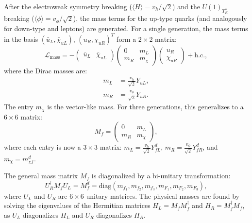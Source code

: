 After the electroweak symmetry breaking ($\langle H \rangle = v_h / \sqrt{2}$) and the $U(1)_{T_R^3}$ breaking ($\langle \phi \rangle = v_\phi / \sqrt{2}$), the mass terms for the up-type quarks (and analogously for down-type and leptons) are generated. For a single generation, the mass terms in the basis $(\bar{u}_L, \bar{\chi}_{u L})$, $(u_R, \chi_{u R})^T$ form a $2 \times 2$ matrix:
\begin{equation}
\mathcal{L}_{\text{mass}} = - \begin{pmatrix} \bar{u}_L & \bar{\chi}_{u L} \end{pmatrix}
\begin{pmatrix}
0 & m_L \\
m_R & m_{\chi}
\end{pmatrix}
\begin{pmatrix} u_R \\ \chi_{u R} \end{pmatrix} + \text{h.c.}, \label{eq:mass_matrix_detail}
\end{equation}
where the Dirac masses are:
\begin{align*}
m_L &= \frac{v_h}{\sqrt{2}} Y_{uL}, \\
m_R &= \frac{v_\phi}{\sqrt{2}} Y_{uR}.
\end{align*}
The entry $m_{\chi}$ is the vector-like mass. For three generations, this generalizes to a $6 \times 6$ matrix:
\begin{equation}
M_f = \begin{pmatrix}
0 & m_L \\
m_R & m_{\chi}
\end{pmatrix},
\end{equation}
where each entry is now a $3 \times 3$ matrix: $m_L = \frac{v_h}{\sqrt{2}} Y_{fL}^{d}$, $m_R = \frac{v_\phi}{\sqrt{2}} Y_{fR}^{d}$, and $m_{\chi} = m_{\chi f}^{d}$.

The general mass matrix $M_f$ is diagonalized by a bi-unitary transformation:
\begin{equation}
U_{R}^{\dagger} M_f U_{L} = M_f^d = \text{diag}(m_{f_1}, m_{f_2}, m_{f_3}, m_{F_1}, m_{F_2}, m_{F_3}), \label{eq:bi_unitary_detail}
\end{equation}
where $U_{L}$ and $U_{R}$ are $6 \times 6$ unitary matrices. The physical masses are found by solving the eigenvalues of the Hermitian matrices $H_L = M_f M_f^\dagger$ and $H_R = M_f^\dagger M_f$, as $U_L$ diagonalizes $H_L$ and $U_R$ diagonalizes $H_R$.

